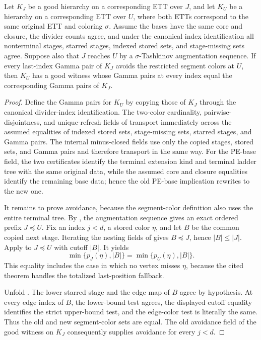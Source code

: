\begin{helper}
Let $K_J$ be a good hierarchy on a corresponding ETT over $J$, and let
$K_U$ be a hierarchy on a corresponding ETT over $U$, where both ETTs
correspond to the same original ETT and coloring $\sigma$.  Assume the
bases have the same core and closure, the divider counts agree, and under
the canonical index identification all nonterminal stages, starred stages,
indexed stored sets, and stage-missing sets agree.  Suppose also that
$J$ reaches $U$ by a $\sigma$-Tashkinov augmentation sequence.  If every
last-index Gamma pair of $K_J$ avoids the restricted segment colors at
$U$, then $K_U$ has a good witness whose Gamma pairs at every index equal
the corresponding Gamma pairs of $K_J$.
\end{helper}
\begin{proof}
Define the Gamma pairs for $K_U$ by copying those of $K_J$ through the
canonical divider-index identification.  The two-color cardinality,
pairwise-disjointness, and unique-refresh fields of
 transport immediately across the assumed
equalities of indexed stored sets, stage-missing sets, starred stages, and
Gamma pairs.  The internal minus-closed fields use only the copied stages,
stored sets, and Gamma pairs and therefore transport in the same way.  For
the PE-base field, the two
 certificates identify the
terminal extension kind and terminal ladder tree with the same original
data, while the assumed core and closure equalities identify the remaining
base data; hence the old PE-base implication rewrites to the new one.

It remains to prove avoidance, because the segment-color definition also
uses the entire terminal tree.  By
, the augmentation
sequence gives an exact ordered prefix $J\preccurlyeq U$.  Fix an index
$j<d$, a stored color $\eta$, and let $B$ be the common copied next stage.
Iterating the nesting fields of  gives
$B\preccurlyeq J$, hence $|B|\leq |J|$.  Apply
 to
$J\preccurlyeq U$ with cutoff $|B|$.  It yields
\[
 \min\{p_J(\eta),|B|\}=\min\{p_U(\eta),|B|\}.
\]
This equality includes the case in which no vertex misses $\eta$, because
the cited theorem handles the totalized last-position fallback.

Unfold .  The lower starred stage and the
edge map of $B$ agree by hypothesis.  At every edge index of $B$, the
lower-bound test agrees, the displayed cutoff equality identifies the
strict upper-bound test, and the edge-color test is literally the same.
Thus the old and new segment-color sets are equal.  The old avoidance
field of the good witness on $K_J$ consequently supplies avoidance for
every $j<d$.


\end{proof}
